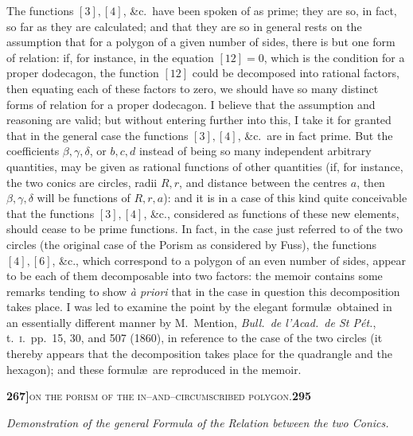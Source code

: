 \documentclass[11pt]{article}
\begin{document}
\medskip

\noindent The functions $[3], [4]$, \&c.\ have been spoken of as prime; they are so, in fact, so far as they are calculated; and that they are so in general rests on the assumption that for a polygon of a given number of sides, there is but one form of relation: if, for instance, in the equation $[12] = 0$, which is the condition for a proper dodecagon, the function $[12]$ could be decomposed into rational factors, then equating each of these factors to zero, we should have so many distinct forms of relation for a proper dodecagon. I believe that the assumption and reasoning are valid; but without entering further into this, I take it for granted that in the general case the functions $[3], [4]$, \&c.\ are in fact prime. But the coefficients $\beta, \gamma, \delta$, or $b, c, d$ instead of being so many independent arbitrary quantities, may be given as rational functions of other quantities (if, for instance, the two conics are circles, radii $R, r$, and distance between the centres $a$, then $\beta, \gamma, \delta$ will be functions of $R, r, a$): and it is in a case of this kind quite conceivable that the functions $[3], [4]$, \&c., considered as functions of these new elements, should cease to be prime functions. In fact, in the case just referred to of the two circles (the original case of the Porism as considered by Fuss), the functions $[4], [6]$, \&c., which correspond to a polygon of an even number of sides, appear to be each of them decomposable into two factors: the memoir contains some remarks tending to show \textit{\`a priori} that in the case in question this decomposition takes place. I was led to examine the point by the elegant formul\ae\ obtained in an essentially different manner by M.~Mention, \textit{Bull.\ de l'Acad.\ de St P\'et.}, t.~\textsc{i.}\ pp.~15, 30, and 507 (1860), in reference to the case of the two circles (it thereby appears that the decomposition takes place for the quadrangle and the hexagon); and these formul\ae\ are reproduced in the memoir.

\newpage
\setcounter{page}{295}

\noindent\textbf{267]}\hfill\textsc{on the porism of the in--and--circumscribed polygon.}\hfill\textbf{295}

\medskip

\begin{center}\textit{Demonstration of the general Formula of the Relation between the two Conics.}\end{center}
\end{document}
